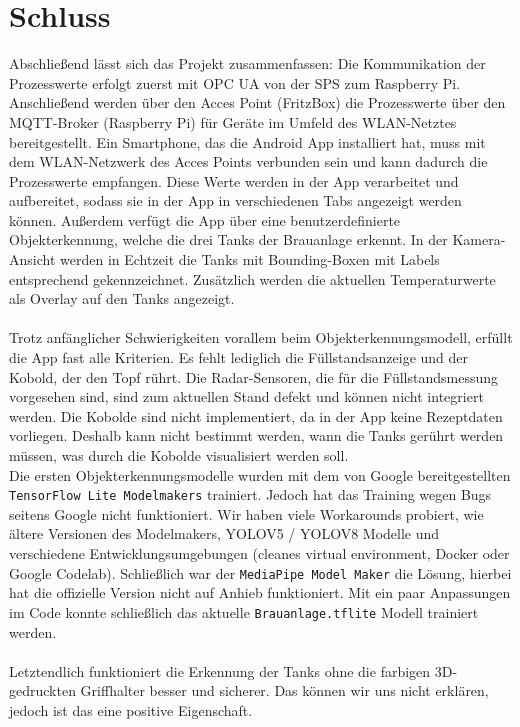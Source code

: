 \clearpage
\section{Schluss}
Abschließend lässt sich das Projekt zusammenfassen: Die Kommunikation der Prozesswerte erfolgt zuerst mit OPC UA von der SPS zum Raspberry Pi. Anschließend werden über den Acces Point (FritzBox) die Prozesswerte über den MQTT-Broker (Raspberry Pi) für Geräte im Umfeld des WLAN-Netztes bereitgestellt.
Ein Smartphone, das die Android App installiert hat, muss mit dem WLAN-Netzwerk des Acces Points verbunden sein und kann dadurch die Prozesswerte empfangen. Diese Werte werden in der App verarbeitet und aufbereitet, sodass sie in der App in verschiedenen Tabs angezeigt werden können.
Außerdem verfügt die App über eine benutzerdefinierte Objekterkennung, welche die drei Tanks der Brauanlage erkennt. In der Kamera-Ansicht werden in Echtzeit die Tanks mit Bounding-Boxen mit Labels entsprechend gekennzeichnet. Zusätzlich werden die aktuellen Temperaturwerte als Overlay auf den Tanks angezeigt. \\
\\
\noindent Trotz anfänglicher Schwierigkeiten vorallem beim Objekterkennungsmodell, erfüllt die App fast alle Kriterien. Es fehlt lediglich die Füllstandsanzeige und der Kobold, der den Topf rührt. Die Radar-Sensoren, die für die Füllstandsmessung vorgesehen sind, sind zum aktuellen Stand defekt und können nicht integriert werden. Die Kobolde sind nicht implementiert, da in der App keine Rezeptdaten vorliegen. Deshalb kann nicht bestimmt werden, wann die Tanks gerührt werden müssen, was durch die Kobolde visualisiert werden soll.
\\
\noindent Die ersten Objekterkennungsmodelle wurden mit dem von Google bereitgestellten \texttt{TensorFlow Lite Modelmakers} trainiert. Jedoch hat das Training wegen Bugs seitens Google nicht funktioniert. Wir haben viele Workarounds probiert, wie ältere Versionen des Modelmakers, YOLOV5 / YOLOV8 Modelle und verschiedene Entwicklungsumgebungen (cleanes virtual environment, Docker oder Google Codelab). Schließlich war der \texttt{MediaPipe Model Maker} die Lösung, hierbei hat die offizielle Version nicht auf Anhieb funktioniert. Mit ein paar Anpassungen im Code konnte schließlich das aktuelle \texttt{Brauanlage.tflite} Modell trainiert werden.
\\ \\
\noindent Letztendlich funktioniert die Erkennung der Tanks ohne die farbigen 3D-gedruckten Griffhalter besser und sicherer. Das können wir uns nicht erklären, jedoch ist das eine positive Eigenschaft.
